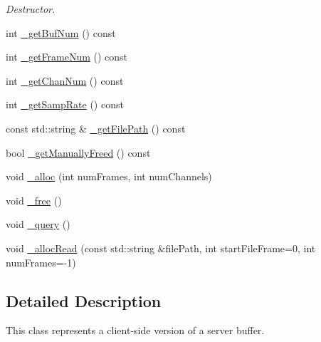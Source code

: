 \begin{DoxyCompactItemize}
\begin{DoxyCompactList}\small\item\em Destructor. \end{DoxyCompactList}\item 
int \hyperlink{classColliderPlusPlus_1_1Buffer_a6d2eb844b20eb62158d5d77bcb5d568c}{\-\_\-get\-Buf\-Num} () const 
\item 
int \hyperlink{classColliderPlusPlus_1_1Buffer_adbd84c84d0c13d9dcc96e36edce17448}{\-\_\-get\-Frame\-Num} () const 
\item 
int \hyperlink{classColliderPlusPlus_1_1Buffer_a1eca16cfed94680f3a14adcd4dfe42c9}{\-\_\-get\-Chan\-Num} () const 
\item 
int \hyperlink{classColliderPlusPlus_1_1Buffer_a6887218a82f341f668117cd24548921a}{\-\_\-get\-Samp\-Rate} () const 
\item 
const std\-::string \& \hyperlink{classColliderPlusPlus_1_1Buffer_a94c409839084712d7cc10fd46e520d68}{\-\_\-get\-File\-Path} () const 
\item 
bool \hyperlink{classColliderPlusPlus_1_1Buffer_abe0bd6783d6619ad9df0b5b6cd194d73}{\-\_\-get\-Manually\-Freed} () const 
\item 
void \hyperlink{classColliderPlusPlus_1_1Buffer_af0248190521ac9b499da2595f5519b12}{\-\_\-alloc} (int num\-Frames, int num\-Channels)
\item 
void \hyperlink{classColliderPlusPlus_1_1Buffer_acdb1aca3342219a321ff61645de4551f}{\-\_\-free} ()
\item 
void \hyperlink{classColliderPlusPlus_1_1Buffer_a15072b705358d59e252e1f6d515e3b94}{\-\_\-query} ()
\item 
void \hyperlink{classColliderPlusPlus_1_1Buffer_a0cbb99a9823f18b151f7f7da4bcf56a7}{\-\_\-alloc\-Read} (const std\-::string \&file\-Path, int start\-File\-Frame=0, int num\-Frames=-\/1)
\end{DoxyCompactItemize}


\subsection{Detailed Description}
This class represents a client-\/side version of a server buffer. 

